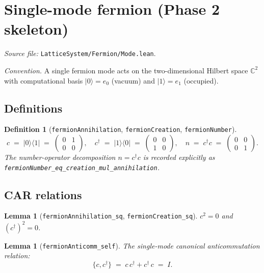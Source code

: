 \documentclass[a4paper,11pt]{article}
\newtheorem{lemma}[theorem]{Lemma}
\newtheorem{definition}[theorem]{Definition}
\begin{document}
\section{Single-mode fermion (Phase 2 skeleton)}
\label{sec:fermion-mode}

\emph{Source file:} \texttt{LatticeSystem/Fermion/Mode.lean}.

\emph{Convention.}  A single fermion mode acts on the two-dimensional
Hilbert space $\mathbb{C}^2$ with computational basis
$|0\rangle = e_0$ (vacuum) and $|1\rangle = e_1$ (occupied).

\subsection{Definitions}

\begin{definition}[\texttt{fermionAnnihilation}, \texttt{fermionCreation}, \texttt{fermionNumber}]
\[
  c \;=\; |0\rangle\langle 1| \;=\;
  \begin{pmatrix} 0 & 1 \\ 0 & 0 \end{pmatrix},
  \quad
  c^\dagger \;=\; |1\rangle\langle 0| \;=\;
  \begin{pmatrix} 0 & 0 \\ 1 & 0 \end{pmatrix},
  \quad
  n \;=\; c^\dagger c \;=\;
  \begin{pmatrix} 0 & 0 \\ 0 & 1 \end{pmatrix}.
\]
The number-operator decomposition $n = c^\dagger c$ is recorded
explicitly as \texttt{fermionNumber\_eq\_creation\_mul\_annihilation}.
\end{definition}

\subsection{CAR relations}

\begin{lemma}[\texttt{fermionAnnihilation\_sq}, \texttt{fermionCreation\_sq}]
$c^2 = 0$ and $(c^\dagger)^2 = 0$.
\end{lemma}

\begin{lemma}[\texttt{fermionAnticomm\_self}]
The single-mode canonical anticommutation relation:
\[
  \{c, c^\dagger\} \;=\; c\,c^\dagger + c^\dagger\,c \;=\; I.
\]
\end{lemma}
\end{document}
